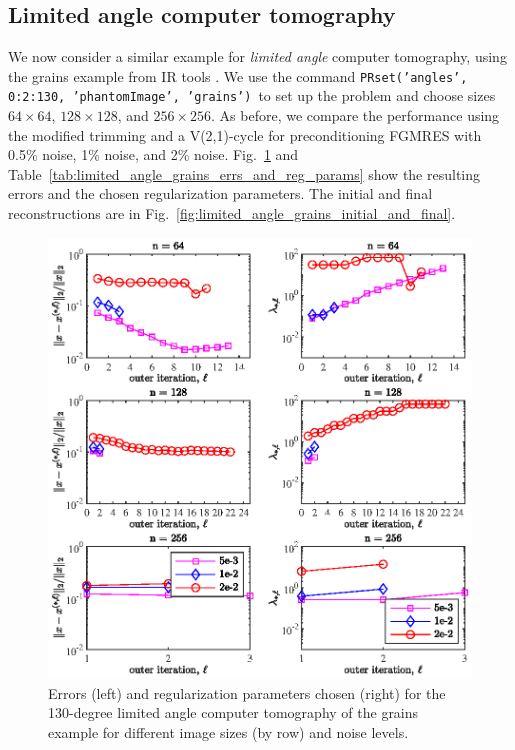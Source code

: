 \subsection{Limited angle computer tomography}
We now consider a similar example for \textit{limited angle} computer tomography, using the grains example from IR tools \cite{art:GAZZ19}. We use the command \texttt{PRset('angles', 0:2:130, 'phantomImage', 'grains')} to set up the problem and choose sizes $64 \times 64$, $128 \times 128$, and $256 \times 256$. As before, we compare the performance using the modified trimming and a V(2,1)-cycle for preconditioning FGMRES with 0.5\% noise, 1\% noise, and 2\% noise. Fig.~\ref{fig:limited_angle_grains_errs_and_reg_params} and Table~\ref{tab:limited_angle_grains_errs_and_reg_params} show the resulting errors and the chosen regularization parameters. The initial and final reconstructions are in Fig.~\ref{fig:limited_angle_grains_initial_and_final}.
\begin{figure}[htbp]
\begin{center}
\includegraphics{figures/limited_angle_grains_errs_and_reg_params}
\caption{Errors (left) and regularization parameters chosen (right) for the 130-degree limited angle computer tomography of the grains example for different image sizes (by row) and noise levels.}
\label{fig:limited_angle_grains_errs_and_reg_params}
\end{center}
\end{figure}
